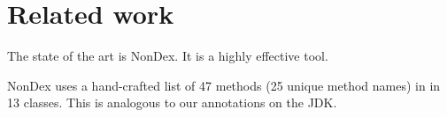 \section{Related work}\label{sec:related}


The state of the art is NonDex.  It is a highly effective tool.

NonDex uses a hand-crafted list of 47 methods (25 unique method names) in
in 13 classes.
This is analogous to our annotations on the JDK\@.

